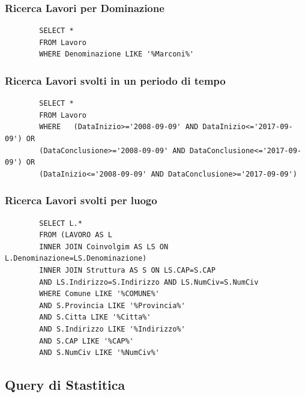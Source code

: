 \documentclass{elegantbook}
\begin{document}
\subsubsection{Ricerca Lavori per Dominazione}
	\begin{verbatim}
		SELECT *
		FROM Lavoro
		WHERE Denominazione LIKE '%Marconi%'
	\end{verbatim}
\subsubsection{Ricerca Lavori svolti in un periodo di tempo}
	\begin{verbatim}
		SELECT *
		FROM Lavoro
		WHERE 	(DataInizio>='2008-09-09' AND DataInizio<='2017-09-09') OR
		(DataConclusione>='2008-09-09' AND DataConclusione<='2017-09-09') OR
		(DataInizio<='2008-09-09' AND DataConclusione>='2017-09-09')
	\end{verbatim}
	\begin{figure}[H]
		\centering
	\end{figure}
\subsubsection{Ricerca Lavori svolti per luogo}
	\begin{verbatim}
		SELECT L.*
		FROM (LAVORO AS L 
		INNER JOIN Coinvolgim AS LS ON L.Denominazione=LS.Denominazione)
		INNER JOIN Struttura AS S ON LS.CAP=S.CAP 
		AND LS.Indirizzo=S.Indirizzo AND LS.NumCiv=S.NumCiv
		WHERE Comune LIKE '%COMUNE%'
		AND S.Provincia LIKE '%Provincia%'
		AND S.Citta LIKE '%Citta%'
		AND S.Indirizzo LIKE '%Indirizzo%'
		AND S.CAP LIKE '%CAP%'
		AND S.NumCiv LIKE '%NumCiv%'
	\end{verbatim}
\subsection{Query di Stastitica}
\end{document}

